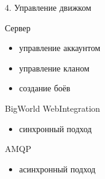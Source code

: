 \documentclass{beamer}
\begin{document}
\begin{frame}{4. Управление движком}
    \begin{block}{Сервер}
        \begin{itemize}
            \item управление аккаунтом
            \item управление кланом
            \item создание боёв
        \end{itemize}
    \end{block}

    \pause
    \begin{block}{BigWorld WebIntegration}
        \begin{itemize}
            \item синхронный подход
        \end{itemize}
    \end{block}

    \pause
    \begin{block}{AMQP}
        \begin{itemize}
            \item асинхронный подход
        \end{itemize}
    \end{block}
\end{frame}
\end{document}
